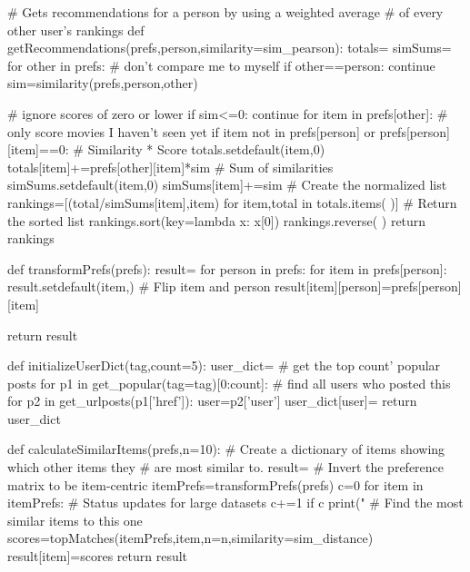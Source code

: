 \documentclass[12pt, letterpaper]{article}
\begin{document}
\begin{MyPython}[caption= Recommendations.py, label=lst:Recommendationspy]
# Gets recommendations for a person by using a weighted average
# of every other user's rankings
def getRecommendations(prefs,person,similarity=sim_pearson):
    totals={}
    simSums={}
    for other in prefs:
        # don't compare me to myself
        if other==person:
            continue
        sim=similarity(prefs,person,other)

        # ignore scores of zero or lower
        if sim<=0:
            continue
        for item in prefs[other]:
            # only score movies I haven't seen yet
            if item not in prefs[person] or prefs[person][item]==0:
                # Similarity * Score
                totals.setdefault(item,0)
                totals[item]+=prefs[other][item]*sim
                # Sum of similarities
                simSums.setdefault(item,0)
                simSums[item]+=sim
    # Create the normalized list
    rankings=[(total/simSums[item],item)
              for item,total in totals.items( )]
    # Return the sorted list
    rankings.sort(key=lambda x: x[0])
    rankings.reverse( )
    return rankings


def transformPrefs(prefs):
    result={}
    for person in prefs:
        for item in prefs[person]:
            result.setdefault(item,{})
            # Flip item and person
            result[item][person]=prefs[person][item]
            
    return result


def initializeUserDict(tag,count=5):
    user_dict={}
    # get the top count' popular posts
    for p1 in get_popular(tag=tag)[0:count]:
        # find all users who posted this
        for p2 in get_urlposts(p1['href']):
            user=p2['user']
            user_dict[user]={}
    return user_dict



def calculateSimilarItems(prefs,n=10):
    # Create a dictionary of items showing which other items they
    # are most similar to.
    result={}
    # Invert the preference matrix to be item-centric
    itemPrefs=transformPrefs(prefs)
    c=0
    for item in itemPrefs:
        # Status updates for large datasets
        c+=1
        if c%
            print("%
        # Find the most similar items to this one
        scores=topMatches(itemPrefs,item,n=n,similarity=sim_distance)
        result[item]=scores
    return result



\end{MyPython}
\end{document}
